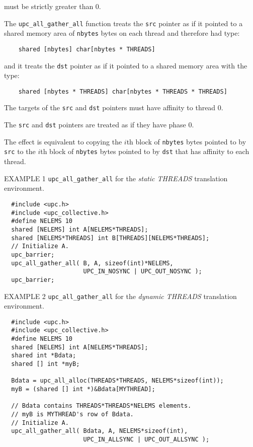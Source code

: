  must be strictly greater than 0.

\np The {\tt upc\_all\_gather\_all} function treats the {\tt src} pointer
as if it pointed to a shared memory area of {\tt nbytes} bytes on each
thread and therefore had type:

\begin{verbatim}
    shared [nbytes] char[nbytes * THREADS]
\end{verbatim}  

\np and it treats the {\tt dst} pointer as if it pointed to a shared
memory area with the type:

\begin{verbatim}
    shared [nbytes * THREADS] char[nbytes * THREADS * THREADS]
\end{verbatim} 

\np The targets of the {\tt src} and {\tt dst} pointers
must have affinity to thread 0.

\np The {\tt src} and {\tt dst} pointers are treated as
if they have phase 0.

\np
The effect is equivalent to copying the
$i$th block of {\tt nbytes} bytes pointed to by {\tt src} to the
$i$th block of {\tt nbytes} bytes pointed to by {\tt dst} that
has affinity to each thread.

\np EXAMPLE 1 {\tt upc\_all\_gather\_all} for the {\em static THREADS}
translation environment.

\begin{verbatim}
  #include <upc.h>
  #include <upc_collective.h>
  #define NELEMS 10
  shared [NELEMS] int A[NELEMS*THREADS];
  shared [NELEMS*THREADS] int B[THREADS][NELEMS*THREADS];
  // Initialize A.
  upc_barrier;
  upc_all_gather_all( B, A, sizeof(int)*NELEMS,
                      UPC_IN_NOSYNC | UPC_OUT_NOSYNC );
  upc_barrier;
\end{verbatim}

\np EXAMPLE 2 {\tt upc\_all\_gather\_all} for the {\em dynamic THREADS}
translation environment.

\begin{verbatim}
  #include <upc.h>
  #include <upc_collective.h>
  #define NELEMS 10
  shared [NELEMS] int A[NELEMS*THREADS];
  shared int *Bdata;
  shared [] int *myB;

  Bdata = upc_all_alloc(THREADS*THREADS, NELEMS*sizeof(int));
  myB = (shared [] int *)&Bdata[MYTHREAD];

  // Bdata contains THREADS*THREADS*NELEMS elements.
  // myB is MYTHREAD's row of Bdata.
  // Initialize A.
  upc_all_gather_all( Bdata, A, NELEMS*sizeof(int),
                      UPC_IN_ALLSYNC | UPC_OUT_ALLSYNC );
\end{verbatim}

